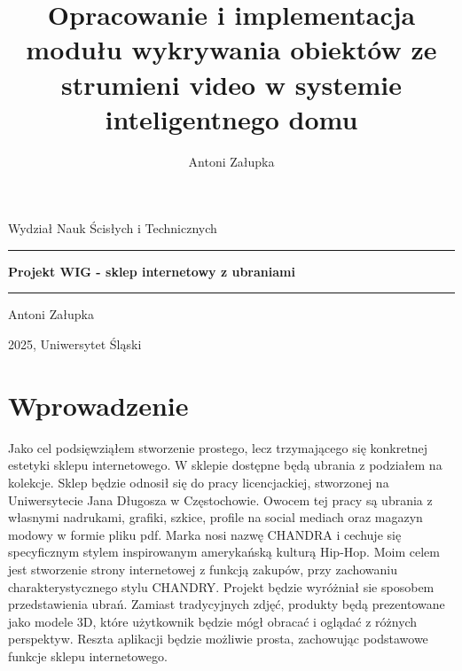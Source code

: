 \documentclass[14pt]{extarticle}
\title{Opracowanie i implementacja modułu wykrywania obiektów ze strumieni video w systemie inteligentnego domu}
\author{Antoni Załupka}
\begin{document}
	\thispagestyle{empty}
	
	\begin{center}
		\Large{Wydział Nauk Ścisłych i Technicznych}
	\end{center}
	
	\vspace{2cm}
	
	\rule{\linewidth}{2mm} 
	
	\begin{center}
		\huge \textbf{Projekt WIG - sklep internetowy z ubraniami} \\
	\end{center}
	
	\rule{\linewidth}{0.5mm} 
	
	\vspace{2cm}
	
	\begin{center}
		\Large{Antoni Załupka}
	\end{center}
	
	\vspace{1.5cm}
	
	
	
	\vspace{8cm}
	
	\begin{center}
		\Large{2025, Uniwersytet Śląski}
	\end{center}
	
	\newpage
	
	\section{Wprowadzenie}
		Jako cel podsięwziąłem stworzenie prostego, lecz trzymającego się konkretnej estetyki sklepu internetowego. W sklepie dostępne będą ubrania z podziałem na kolekcje. Sklep będzie odnosił się do pracy licencjackiej, stworzonej na Uniwersytecie Jana Długosza w Częstochowie. Owocem tej pracy są ubrania z własnymi nadrukami, grafiki, szkice, profile na social mediach oraz magazyn modowy w formie pliku pdf. Marka nosi nazwę CHANDRA i cechuje się specyficznym stylem inspirowanym amerykańską kulturą Hip-Hop. Moim celem jest stworzenie strony internetowej z funkcją zakupów, przy zachowaniu charakterystycznego stylu CHANDRY. Projekt będzie wyróżniał sie sposobem przedstawienia ubrań. Zamiast tradycyjnych zdjęć, produkty będą prezentowane jako modele 3D, które użytkownik będzie mógł obracać i oglądać z różnych perspektyw. Reszta aplikacji będzie możliwie prosta, zachowując podstawowe funkcje sklepu internetowego.
		
\end{document}
